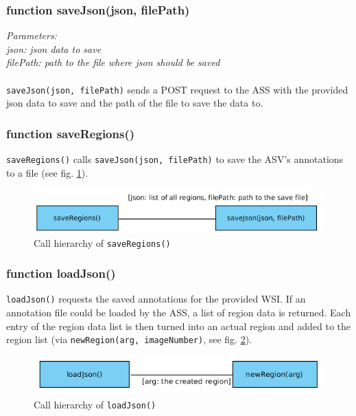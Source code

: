 \subsubsection{function saveJson(json, filePath)}
\emph{Parameters:\\
	json: json data to save\\
	filePath: path to the file where json should be saved\\ \\
}
\texttt{saveJson(json, filePath)} sends a POST request to the ASS with the provided json data to save and the path of the file to save the data to.


\subsubsection{function saveRegions()}
\texttt{saveRegions()} calls \texttt{saveJson(json, filePath)} to save the ASV's annotations to a file (see fig. \ref{figB_saveRegs}).

\begin{figure}[H]
	\begin{center}
		\includegraphics[scale=0.5]{img/ch_saveRegs.png}
		\caption{Call hierarchy of \texttt{saveRegions()}}
		\label{figB_saveRegs}
	\end{center}
\end{figure}


\subsubsection{function loadJson()}
\texttt{loadJson()} requests the saved annotations for the provided WSI. If an annotation file could be loaded by the ASS, a list of region data is returned. Each entry of the region data list is then turned into an actual region and added to the region list (via \texttt{newRegion(arg, imageNumber)}, see fig. \ref{figB_loadJson}).

\begin{figure}[H]
	\begin{center}
		\includegraphics[scale=0.5]{img/ch_loadJson.png}
		\caption{Call hierarchy of \texttt{loadJson()}}
		\label{figB_loadJson}
	\end{center}
\end{figure}


